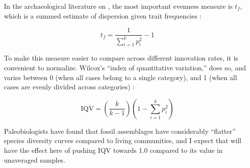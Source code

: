 In the archaeological literature on \ct, the most important evenness measure is $t_f$, which is a summed estimate of dispersion given trait frequencies \citet{Neiman1995}:  

\begin{equation}
\label{eq:tf-formula}
t_f = \frac{1}{\sum_{i=1}^k p_i^2} - 1
\end{equation}

To make this measure easier to compare across different innovation rates, it is convenient to normalize.   Wilcox's ``index of quantitative variation,'' does so, and varies between 0 (when all cases belong to a single category), and 1 (when all cases are evenly divided across categories) \citep{wilcox1973indices}:

\begin{equation}
\label{eq:iqv-formula}
\mathrm{IQV} = (\frac{k}{k-1}) (1 - \sum_{i=1}^k p_i^2 )
\end{equation}

Paleobiologists have found that fossil assemblages have considerably ``flatter'' species diversity curves compared to living communities, and I expect that \timeav will have the effect here of pushing $\mathrm{IQV}$ towards 1.0 compared to its value in unaveraged samples.  



